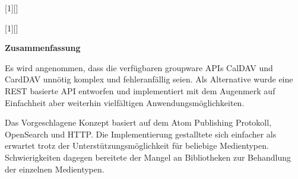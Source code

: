 \documentclass[11pt,a4paper,headsepline,twoside]{scrartcl}		%
\begin{document}
[1][]
  {\lstset{language=Java,float=tb,#1}}%
  {} %

[1][]
  {\lstset{float=tb,#1}}%
  {} %

\lstset{ %
  float=tb,
  frame=single, %
  captionpos=b,
         basicstyle=\footnotesize\ttfamily, %
         numberstyle=\tiny,          %
    numbersep=5pt,              %
    tabsize=2,                  %
    extendedchars=true,         %
    breaklines=true,            %
    stringstyle=\ttfamily, %
    showspaces=false,           %
    showtabs=false,             %
    showstringspaces=false      %
}


\cleardoublepage
{}
\setcounter{page}{3} 


\vspace{1cm}
\Large{\textbf{Zusammenfassung}}
\vspace{1cm}
\normalsize{}

Es wird angenommen, dass die verfügbaren groupware APIs CalDAV und CardDAV
unnötig komplex und fehleranfällig seien. Als Alternative wurde eine REST
basierte API entworfen und implementiert mit dem Augenmerk auf Einfachheit aber
weiterhin vielfältigen Anwendungsmöglichkeiten.

Das Vorgeschlagene Konzept basiert auf dem Atom Publishing Protokoll, OpenSearch
und HTTP. Die Implementierung gestalltete sich einfacher als erwartet trotz der
Unterstützungsmöglichkeit für beliebige Medientypen. Schwierigkeiten dagegen
bereitete der Mangel an Bibliotheken zur Behandlung der einzelnen Medientypen.
\end{document}
